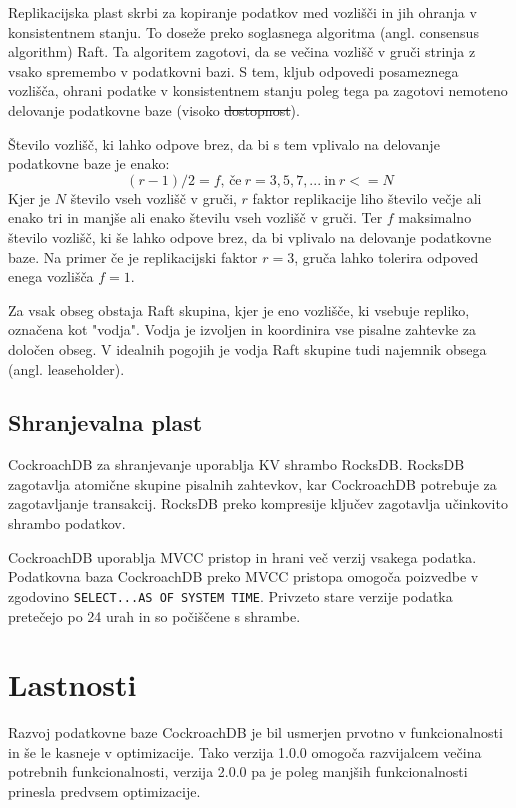 \documentclass[a4paper, 12pt]{book}
\providecommand{\DIFaddtex}[1]{{\protect\color{blue}\uwave{#1}}} %
\providecommand{\DIFdeltex}[1]{{\protect\color{red}\sout{#1}}}                      %
\providecommand{\DIFaddbegin}{} %
\providecommand{\DIFaddend}{} %
\providecommand{\DIFdelbegin}{} %
\providecommand{\DIFdelend}{} %
\providecommand{\DIFadd}[1]{\texorpdfstring{\DIFaddtex{#1}}{#1}} %
\providecommand{\DIFdel}[1]{\texorpdfstring{\DIFdeltex{#1}}{}} %
\newcommand{\DIFscaledelfig}{0.5}
\newlength{\DIFdelgraphicswidth} %
\newlength{\DIFdelgraphicsheight} %
\newcommand{\DIFaddincludegraphics}[2][]{{\color{blue}\fbox{\DIFOincludegraphics[#1]{#2}}}} %
\newcommand{\DIFdelincludegraphics}[2][]{%
\sbox{\DIFdelgraphicsbox}{\DIFOincludegraphics[#1]{#2}}%
\settoboxwidth{\DIFdelgraphicswidth}{\DIFdelgraphicsbox} %
\settoboxtotalheight{\DIFdelgraphicsheight}{\DIFdelgraphicsbox} %
\scalebox{\DIFscaledelfig}{%
\parbox[b]{\DIFdelgraphicswidth}{\usebox{\DIFdelgraphicsbox}\\[-\baselineskip] \rule{\DIFdelgraphicswidth}{0em}}\llap{\resizebox{\DIFdelgraphicswidth}{\DIFdelgraphicsheight}{%
\setlength{\unitlength}{\DIFdelgraphicswidth}%
\begin{picture}(1,1)%
\thicklines\linethickness{2pt} %
{\color[rgb]{1,0,0}\put(0,0){\framebox(1,1){}}}%
{\color[rgb]{1,0,0}\put(0,0){\line( 1,1){1}}}%
{\color[rgb]{1,0,0}\put(0,1){\line(1,-1){1}}}%
\end{picture}%
}\hspace*{3pt}}} %
} %
\DeclareRobustCommand{\DIFaddbegin}{\DIFOaddbegin \let\includegraphics\DIFaddincludegraphics} %
\DeclareRobustCommand{\DIFaddend}{\DIFOaddend \let\includegraphics\DIFOincludegraphics} %
\DeclareRobustCommand{\DIFdelbegin}{\DIFOdelbegin \let\includegraphics\DIFdelincludegraphics} %
\DeclareRobustCommand{\DIFdelend}{\DIFOaddend \let\includegraphics\DIFOincludegraphics} %
\begin{document}
Replikacijska plast skrbi za kopiranje podatkov med vozlišči in jih ohranja v konsistentnem stanju. To doseže preko soglasnega algoritma (angl. consensus algorithm) Raft. Ta algoritem zagotovi, da se večina vozlišč v gruči strinja z vsako spremembo v podatkovni bazi. S tem, kljub odpovedi posameznega vozlišča, ohrani podatke v konsistentnem stanju poleg tega pa zagotovi nemoteno delovanje podatkovne baze (visoko \DIFdelbegin \DIFdel{dostopnost}\DIFdelend \DIFaddbegin \DIFadd{razpoložljivost}\DIFaddend ).

Število vozlišč, ki lahko odpove brez, da bi s tem vplivalo na delovanje podatkovne baze je enako:
\[(r - 1)/2 = f \text{, če}\ r = 3, 5, 7, ...\ \text{in}\ r <= N\]
Kjer je \(N\) število vseh vozlišč v gruči, \(r\) faktor replikacije liho število večje ali enako tri in manjše ali enako številu vseh vozlišč v gruči. Ter \(f\) maksimalno število vozlišč, ki še lahko odpove brez, da bi vplivalo na delovanje podatkovne baze. Na primer če je replikacijski faktor \(r = 3\), gruča lahko tolerira odpoved enega vozlišča \(f = 1\).

Za vsak obseg obstaja Raft skupina, kjer je eno vozlišče, ki vsebuje repliko, označena kot "vodja". Vodja je izvoljen in koordinira vse pisalne zahtevke za določen obseg. V idealnih pogojih je vodja Raft skupine tudi najemnik obsega (angl. leaseholder).


\subsection{Shranjevalna plast}

CockroachDB za shranjevanje uporablja KV shrambo RocksDB. RocksDB zagotavlja atomične skupine pisalnih zahtevkov, kar CockroachDB potrebuje za zagotavljanje transakcij. RocksDB preko kompresije ključev zagotavlja učinkovito shrambo podatkov.

CockroachDB uporablja MVCC pristop in hrani več verzij vsakega podatka. Podatkovna baza CockroachDB preko MVCC pristopa omogoča poizvedbe v zgodovino \texttt{SELECT...AS OF SYSTEM TIME}. Privzeto stare verzije podatka pretečejo po 24 urah in so počiščene s shrambe.

\section{Lastnosti}
Razvoj podatkovne baze CockroachDB je bil usmerjen prvotno v funkcionalnosti in še le kasneje v optimizacije. Tako verzija 1.0.0 omogoča razvijalcem večina potrebnih funkcionalnosti, verzija 2.0.0 pa je poleg manjših funkcionalnosti prinesla predvsem optimizacije.
\end{document}
